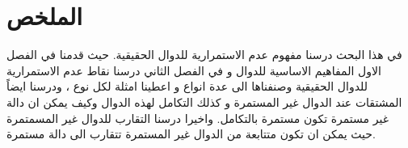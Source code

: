 \chapter*{الملخص}
في هذا البحث درسنا مفهوم عدم الاستمرارية للدوال الحقيقية. حيث قدمنا في الفصل الاول المفاهيم الاساسية للدوال و في الفصل الثاني درسنا نقاط عدم الاستمرارية للدوال الحقيقية وصنفناها الى عدة انواع و اعطينا امثلة لكل نوع ، ودرسنا ايضاً المشتقات عند الدوال غير المستمرة و كذلك التكامل لهذه الدوال وكيف يمكن ان  دالة غير مستمرة تكون مستمرة بالتكامل. واخيرا درسنا التقارب للدوال غير المسمتمرة حيث يمكن ان تكون متتابعة من الدوال غير المستمرة تتقارب الى دالة مستمرة.
